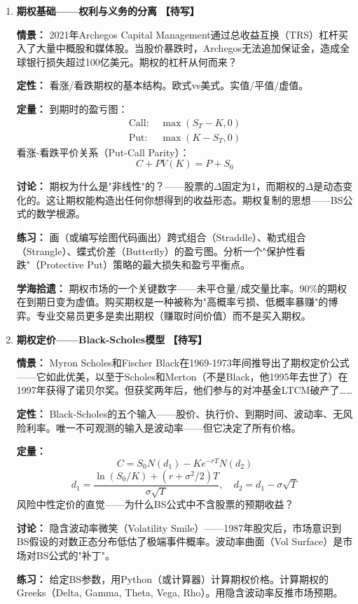 \documentclass[a4paper,11pt]{ctexart}
\newcommand{\draft}{\textcolor{orange!80!black}{\textbf{【待写】}}}
\begin{document}
\begin{enumerate}
\item[\textbf{第11课}] \textbf{期权基础——权利与义务的分离} \draft

\textbf{情景：} 2021年Archegos Capital Management通过总收益互换（TRS）杠杆买入了大量中概股和媒体股。当股价暴跌时，Archegos无法追加保证金，造成全球银行损失超过100亿美元。期权的杠杆从何而来？

\textbf{定性：} 看涨/看跌期权的基本结构。欧式vs美式。实值/平值/虚值。

\textbf{定量：} 到期时的盈亏图：
\begin{align*}
\text{Call: } & \max(S_T - K, 0) \\
\text{Put: } & \max(K - S_T, 0)
\end{align*}
看涨-看跌平价关系（Put-Call Parity）：
\[
C + PV(K) = P + S_0
\]

\textbf{讨论：} 期权为什么是"非线性"的？——股票的$\Delta$固定为1，而期权的$\Delta$是动态变化的。这让期权能构造出任何你想得到的收益形态。期权复制的思想——BS公式的数学根源。

\textbf{练习：} 画（或编写绘图代码画出）跨式组合（Straddle）、勒式组合（Strangle）、蝶式价差（Butterfly）的盈亏图。分析一个"保护性看跌"（Protective Put）策略的最大损失和盈亏平衡点。

\textbf{学海拾遗：} 期权市场的一个关键数字——未平仓量/成交量比率。90\%的期权在到期日变为虚值。购买期权是一种被称为"高概率亏损、低概率暴赚"的博弈。专业交易员更多是卖出期权（赚取时间价值）而不是买入期权。

\item[\textbf{第12课}] \textbf{期权定价——Black-Scholes模型} \draft

\textbf{情景：} Myron Scholes和Fischer Black在1969-1973年间推导出了期权定价公式——它如此优美，以至于Scholes和Merton（不是Black，他1995年去世了）在1997年获得了诺贝尔奖。但获奖两年后，他们参与的对冲基金LTCM破产了……

\textbf{定性：} Black-Scholes的五个输入——股价、执行价、到期时间、波动率、无风险利率。唯一不可观测的输入是波动率——但它决定了所有价格。

\textbf{定量：}
\[
C = S_0 N(d_1) - K e^{-rT} N(d_2)
\]
\[
d_1 = \frac{\ln(S_0/K) + (r + \sigma^2/2)T}{\sigma\sqrt{T}}, \quad d_2 = d_1 - \sigma\sqrt{T}
\]
风险中性定价的直觉——为什么BS公式中不含股票的预期收益？

\textbf{讨论：} 隐含波动率微笑（Volatility Smile）——1987年股灾后，市场意识到BS假设的对数正态分布低估了极端事件概率。波动率曲面（Vol Surface）是市场对BS公式的"补丁"。

\textbf{练习：} 给定BS参数，用Python（或计算器）计算期权价格。计算期权的Greeks（Delta, Gamma, Theta, Vega, Rho）。用隐含波动率反推市场预期。


\end{enumerate}
\end{document}

